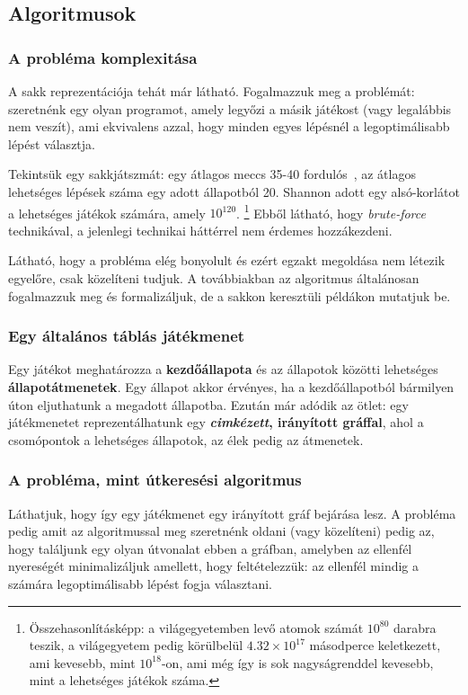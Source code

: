 \documentclass[twoside, a4paper, 12pt]{article}
\begin{document}
\subsection{Algoritmusok}
\subsubsection{A probléma komplexitása}
A sakk reprezentációja tehát már látható. Fogalmazzuk meg a problémát: szeretnénk egy olyan programot, amely legyőzi a másik játékost (vagy legalábbis nem veszít), ami ekvivalens azzal, hogy minden egyes lépésnél a legoptimálisabb lépést választja.

Tekintsük egy sakkjátszmát: egy átlagos meccs 35-40 fordulós~\cite{averageLengthOfChessGame}\cite{averageLengthOfChessGame2}\cite{chessStatistics}, az átlagos lehetséges lépések száma egy adott állapotból 20\cite{shannonnumber}. Shannon adott egy alsó-korlátot a lehetséges játékok számára, amely $10^{120}$. \footnote{Összehasonlításképp: a világegyetemben levő atomok számát $10^{80}$ darabra teszik, a világegyetem pedig körülbelül $4.32 \times 10^{17}$ másodperce keletkezett, ami kevesebb, mint $10^{18}$-on, ami még így is sok nagyságrenddel kevesebb, mint a lehetséges játékok száma.} Ebből látható, hogy \textit{brute-force} technikával, a jelenlegi technikai háttérrel nem érdemes hozzákezdeni.

Látható, hogy a probléma elég bonyolult és ezért egzakt megoldása nem létezik egyelőre, csak közelíteni tudjuk. A továbbiakban az algoritmus általánosan fogalmazzuk meg és formalizáljuk, de a sakkon keresztüli példákon mutatjuk be.

\subsubsection{Egy általános táblás játékmenet}
Egy játékot meghatározza a \textbf{kezdőállapota} és az állapotok közötti lehetséges \textbf{állapotátmenetek}. Egy állapot akkor érvényes, ha a kezdőállapotból bármilyen úton eljuthatunk a megadott állapotba. Ezután már adódik az ötlet: egy játékmenetet reprezentálhatunk egy \textbf{\textit{cimkézett}, irányított gráffal}, ahol a csomópontok a lehetséges állapotok, az élek pedig az átmenetek.

\subsubsection{A probléma, mint útkeresési algoritmus}
Láthatjuk, hogy így egy játékmenet egy irányított gráf bejárása lesz. A probléma pedig amit az algoritmussal meg szeretnénk oldani (vagy közelíteni) pedig az, hogy találjunk egy olyan útvonalat ebben a gráfban, amelyben az ellenfél nyereségét minimalizáljuk amellett, hogy feltételezzük: az ellenfél mindig a számára legoptimálisabb lépést fogja választani.
\end{document}
